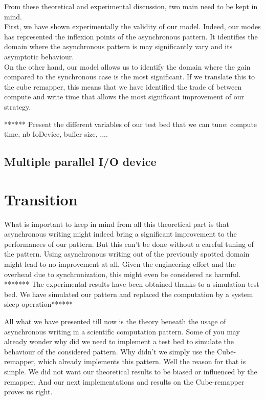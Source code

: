 \documentclass[12pt]{article}											%
\begin{document}
		From these theoretical and experimental discussion, two main need to be kept in mind.\\
		First, we have shown experimentally the validity of our model.   Indeed, our modes has represented the inflexion points of the asynchronous pattern.   It identifies the domain where the asynchronous pattern is may significantly vary and its asymptotic behaviour.\\

		On the other hand, our model allows us to identify the domain where the gain compared to the synchronous case is the most significant.   If we translate this to the cube remapper, this means that we have identified the trade of between compute and write time that allows the most significant improvement of our strategy.

		****** Present the different variables of our test bed that we can tune: compute time, nb IoDevice, buffer size, ....

	\subsection{Multiple parallel I/O device}


\section{Transition}
	What is important to keep in mind from all this theoretical part is that asynchronous writing might indeed bring a significant improvement to the performances of our pattern.   But this can't be done without a careful tuning of the pattern.   Using asynchronous writing out of the previously spotted domain might lead to no improvement at all.   Given the engineering effort and the overhead due to synchronization, this might even be considered as harmful.\\
	******* The experimental results have been obtained thanks to a simulation test bed.   We have simulated our pattern and replaced the computation by a system sleep operation******

	All what we have presented till now is the theory beneath the usage of asynchronous writing in a scientific computation pattern.   Some of you may already wonder why did we need to implement a test bed to simulate the behaviour of the considered pattern.   Why didn't we simply use the Cube-remapper, which already implements this pattern.   Well the reason for that is simple.   We did not want our theoretical results to be biased or influenced by the remapper.   And our next implementations and results on the Cube-remapper proves us right.\\
\end{document}
